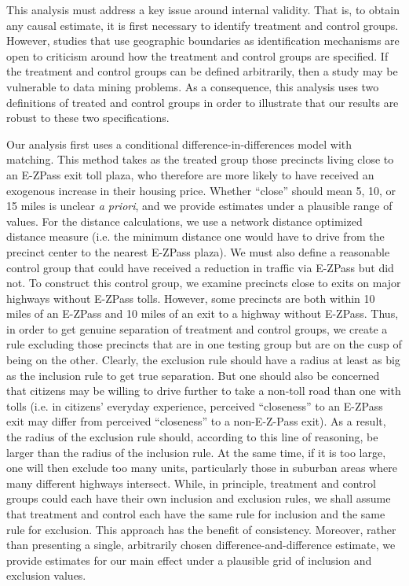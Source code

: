 This analysis must address a key issue around internal validity. That is, to obtain any causal estimate, it is first necessary to identify treatment and control groups. However, studies that use geographic boundaries as identification mechanisms are open to criticism around how the treatment and control groups are specified. If the treatment and control groups can be defined arbitrarily, then a study may be vulnerable to data mining problems. As a consequence, this analysis uses two definitions of treated and control groups in order to illustrate that our results are robust to these two specifications. 

Our analysis first uses a conditional difference-in-differences model with matching. This method takes as the treated group those precincts living close to an E-ZPass exit toll plaza, who therefore are more likely to have received an exogenous increase in their housing price. Whether ``close'' should mean 5, 10, or 15 miles is unclear \emph{a priori}, and we provide estimates under a plausible range of values. For the distance calculations, we use a network distance optimized distance measure (i.e. the minimum distance one would have to drive from the precinct center to the nearest E-ZPass plaza). We must also define a reasonable control group that could have received a reduction in traffic via E-ZPass but did not. To construct this control group, we examine precincts close to exits on major highways without E-ZPass tolls. However, some precincts are both within 10 miles of an E-ZPass and 10 miles of an exit to a highway without E-ZPass. Thus, in order to get genuine separation of treatment and control groups, we create a rule excluding those precincts that are in one testing group but are on the cusp of being on the other. Clearly, the exclusion rule should have a radius at least as big as the inclusion rule to get true separation. But one should also be concerned that citizens may be willing to drive further to take a non-toll road than one with tolls (i.e. in citizens' everyday experience, perceived ``closeness'' to an E-ZPass exit may differ from perceived ``closeness'' to a non-E-Z-Pass exit). As a result, the radius of the exclusion rule should, according to this line of reasoning, be larger than the radius of the inclusion rule. At the same time, if it is too large, one will then exclude too many units, particularly those in suburban areas where many different highways intersect. While, in principle, treatment and control groups could each have their own inclusion and exclusion rules, we shall assume that treatment and control each have the same rule for inclusion and the same rule for exclusion. This approach has the benefit of consistency. Moreover, rather than presenting a single, arbitrarily chosen difference-and-difference estimate, we provide estimates for our main effect under a plausible grid of inclusion and exclusion values. 

